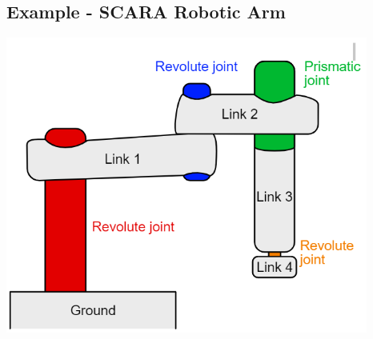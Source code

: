\documentclass{article}
\begin{document}
\subsection*{Example - SCARA Robotic Arm}
\begin{center}
    \includegraphics*[scale=0.8]{W7_9.png}
\end{center}
\end{document}
